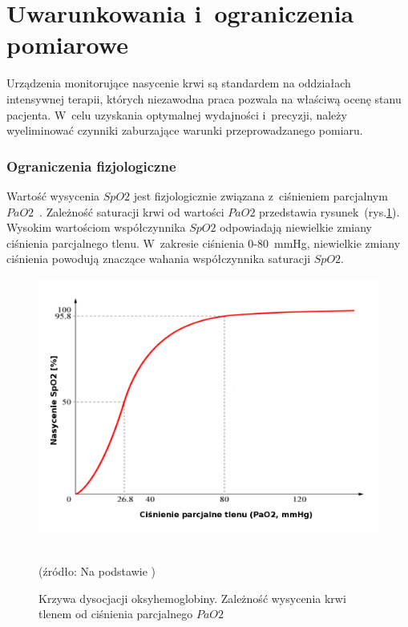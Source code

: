\section{Uwarunkowania i~ograniczenia pomiarowe}
\label{sec:Ograniczenia}

Urządzenia monitorujące nasycenie krwi są standardem na oddziałach intensywnej terapii, których niezawodna praca pozwala na właściwą ocenę stanu pacjenta. W~celu uzyskania optymalnej wydajności
i~precyzji, należy wyeliminować czynniki zaburzające warunki przeprowadzanego pomiaru. 

\subsubsection{Ograniczenia fizjologiczne}
\label{subsubsec:fizj}

Wartość wysycenia $SpO2$ jest fizjologicznie związana z~ciśnieniem parcjalnym $PaO2$~\cite{Fuzzy:2011}. Zależność saturacji krwi od wartości $PaO2$ przedstawia rysunek~(rys.\ref{rys:PaO2}).
Wysokim wartościom współczynnika $SpO2$ odpowiadają niewielkie zmiany ciśnienia parcjalnego tlenu. W~zakresie ciśnienia 0-80~mmHg, niewielkie zmiany ciśnienia powodują znaczące wahania
współczynnika saturacji $SpO2$.
\begin{figure}[ht]
\centerline{\includegraphics[scale = 0.32]{graphic/PaO2}}
	\caption{Krzywa dysocjacji oksyhemoglobiny. Zależność wysycenia krwi tlenem od ciśnienia parcjalnego $PaO2$}
	\label{rys:PaO2}
	~\\
	(źródło: Na podstawie \cite{Fuzzy:2011})
\end{figure}

